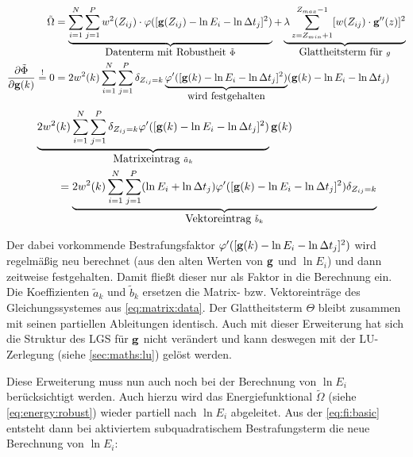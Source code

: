 \begin{align}
\label{eq:energy:robust}
\tilde{\Omega} &= 
    \underbrace{\sum_{i=1}^{N} \sum_{j=1}^{P} w^2(Z_{ij})
    \cdot \varphi([\mathbf g(Z_{ij}) - \ln E_i - \ln \Delta t_j]^2)}_{\mbox{Datenterm mit Robustheit }\tilde{\Phi}}
    + \underbrace{\lambda  \sum_{z=Z_{min}+1}^{Z_{max}-1} [w(Z_{ij}) \cdot \mathbf g''(z)]^2}_{\mbox{Glattheitsterm für }g}\\
\frac{\partial \tilde{\Phi}}{\partial \mathbf g(k)} \overset{!}{=} 0 &= 
    2 w^2(k) \sum_{i=1}^{N} \sum_{j=1}^{P}\delta_{Z_{ij}=k} 
    \underbrace{
        \varphi'(
            [\mathbf g(k)-\ln E_i - \ln \Delta t_j]^2
        )
    }_{\mbox{wird festgehalten}}
    (\mathbf g(k)-\ln E_i - \ln \Delta t_j)
\end{align}
\begin{align}
    &\underbrace{
        2w^2(k)\sum_{i=1}^{N} \sum_{j=1}^{P}  
            \delta_{Z_{ij}=k}
            \varphi'(
                [\mathbf g(k)-\ln E_i - \ln \Delta t_j]^2
            )
    }_{\mbox{Matrixeintrag } \tilde{a}_k}\mathbf g(k) \nonumber \\
    &\qquad= 
    \underbrace{
        2w^2(k)\sum_{i=1}^{N} \sum_{j=1}^{P} 
            (\ln E_i +\ln \Delta t_j)
            \varphi'(
                [\mathbf g(k)-\ln E_i - \ln \Delta t_j]^2
            )
            \delta_{Z_{ij}=k}
    }_{\mbox{Vektoreintrag }\tilde{b}_k}
\end{align}

Der dabei vorkommende Bestrafungsfaktor $\varphi'([\mathbf g(k)-\ln E_i - \ln \Delta t_j]^2)$ wird regelmäßig neu berechnet  (aus den alten Werten von $\mathbf g$ und $\ln E_i$) und dann zeitweise festgehalten. Damit fließt dieser nur als Faktor in die Berechnung ein. Die Koeffizienten $\tilde a_k$ und $\tilde b_k$ ersetzen die Matrix- bzw. Vektoreinträge des Gleichungssystemes aus \autoref{eq:matrix:data}. Der Glattheitsterm $\Theta$ bleibt zusammen mit seinen partiellen Ableitungen identisch. Auch mit dieser Erweiterung hat sich die Struktur des LGS für $\mathbf g$ nicht verändert und kann deswegen mit der LU-Zerlegung (siehe \autoref{sec:maths:lu}) gelöst werden. 

\label{subsec:robust:e:daten}
Diese Erweiterung muss nun auch noch bei der Berechnung von $\ln E_i$ berücksichtigt werden. Auch hierzu wird das Energiefunktional $\tilde{\Omega}$ (siehe \autoref{eq:energy:robust}) wieder partiell nach $\ln E_i$ abgeleitet. Aus der \autoref{eq:fi:basic} entsteht dann bei aktiviertem subquadratischem Bestrafungsterm die neue Berechnung von $\ln E_i$:

